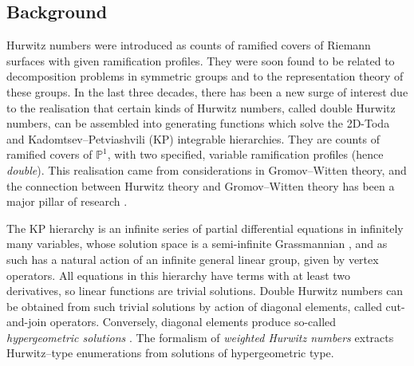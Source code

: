 \documentclass[10pt,a4paper,oneside,no-math,reqno]{amsart}%
\theoremstyle{plain}
\theoremstyle{definition}
\theoremstyle{remark}
\numberwithin{equation}{section}
\newcommand{\mb}[1]{\mathbb{#1}}
\newcommand{\1}{\mathds{1}}
\renewcommand{\P}{\mb{P}}
\newcommand{\<}{\langle}
\renewcommand{\>}{\rangle}
\begin{document}
\subsection{Background}
Hurwitz numbers were introduced \cite{Hur1879,Hur01} as counts of ramified covers of Riemann surfaces with given ramification profiles. They were soon found to be related to decomposition problems in symmetric groups and to the representation theory of these groups. In the last three decades, there has been a new surge of interest due to the realisation \cite{Pan00,Ok00} that certain kinds of Hurwitz numbers, called double Hurwitz numbers, can be assembled into generating functions which solve the 2D-Toda and Kadomtsev--Petviashvili (KP) integrable hierarchies. They are counts of ramified covers of $ \P^1$, with two specified, variable ramification profiles (hence \emph{double}). This realisation came from considerations in Gromov--Witten theory, and the connection between Hurwitz theory and Gromov--Witten theory has been a major pillar of research \cite{OP06,OP06a,GKLS25}. 

The KP hierarchy is an infinite series of partial differential equations in infinitely many variables, whose solution space is a semi-infinite Grassmannian \cite{SS83}, and as such has a natural action of an infinite general linear group, given by vertex operators. All equations in this hierarchy have terms with at least two derivatives, so linear functions are trivial solutions. Double Hurwitz numbers can be obtained from such trivial solutions by action of diagonal elements, called cut-and-join operators. Conversely, diagonal elements produce so-called \emph{hypergeometric solutions} \cite{orlov2001hypergeometric}. The formalism of \emph{weighted Hurwitz numbers} \cite{GPH17} extracts Hurwitz--type enumerations from solutions of hypergeometric type.
\end{document}
